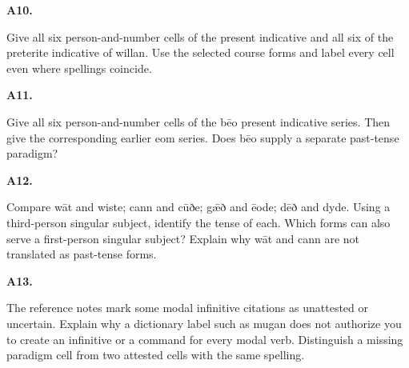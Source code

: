 \par\begin{minipage}{\linewidth}\raggedright
\textbf{A10.}

Give all six person-and-number cells of the present indicative and all six of the preterite indicative of willan. Use the selected course forms and label every cell even where spellings coincide.

\end{minipage}\par\addvspace{4pt}

\par\begin{minipage}{\linewidth}\raggedright
\textbf{A11.}

Give all six person-and-number cells of the bēo present indicative series. Then give the corresponding earlier eom series. Does bēo supply a separate past-tense paradigm?

\end{minipage}\par\addvspace{4pt}

\par\begin{minipage}{\linewidth}\raggedright
\textbf{A12.}

Compare wāt and wiste; cann and cūðe; gǣð and ēode; dēð and dyde. Using a third-person singular subject, identify the tense of each. Which forms can also serve a first-person singular subject? Explain why wāt and cann are not translated as past-tense forms.

\end{minipage}\par\addvspace{4pt}

\par\begin{minipage}{\linewidth}\raggedright
\textbf{A13.}

The reference notes mark some modal infinitive citations as unattested or uncertain. Explain why a dictionary label such as mugan does not authorize you to create an infinitive or a command for every modal verb. Distinguish a missing paradigm cell from two attested cells with the same spelling.

\end{minipage}\par\addvspace{4pt}

